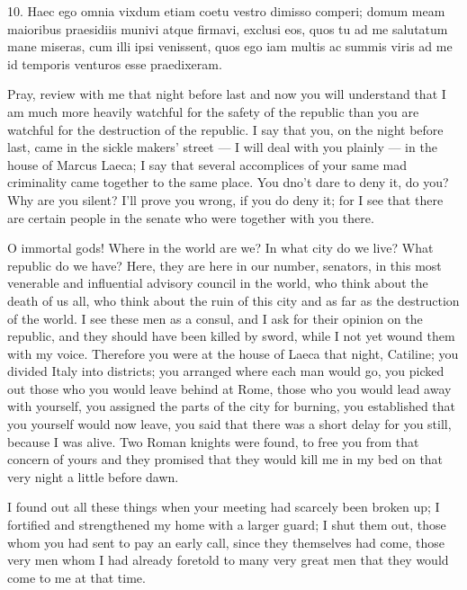 {  %
  10. Haec ego omnia vixdum etiam coetu vestro dimisso comperi; domum meam maioribus praesidiis munivi atque firmavi, exclusi eos, quos tu ad me salutatum mane miseras, cum illi ipsi venissent, quos ego iam multis ac summis viris ad me id temporis venturos esse praedixeram. 
}{
  Pray, review with me that night before last and now you will understand that I am much more heavily watchful for the safety of the republic than you are watchful for the destruction of the republic. I say that you, on the night before last, came in the sickle makers’ street --- I will deal with you plainly --- in the house of Marcus Laeca; I say that several accomplices of your same mad criminality came together to the same place. You dno’t dare to deny it, do you? Why are you silent? I’ll prove you wrong, if you do deny it; for I see that there are certain people in the senate who were together with you there.

  O immortal gods! Where in the world are we? In what city do we live? What republic do we have? Here, they are here in our number, senators, in this most venerable and influential advisory council in the world, who think about the death of us all, who think about the ruin of this city and as far as the destruction of the world. I see these men as a consul, and I ask for their opinion on the republic, and they should have been killed by sword, while I not yet wound them with my voice. Therefore you were at the house of Laeca that night, Catiline; you divided Italy into districts; you arranged where each man would go, you picked out those who you would leave behind at Rome, those who you would lead away with yourself, you assigned the parts of the city for burning, you established that you yourself would now leave, you said that there was a short delay for you still, because I was alive. Two Roman knights were found, to free you from that concern of yours and they promised that they would kill me in my bed on that very night a little before dawn. 

  I found out all these things when your meeting had scarcely been broken up; I fortified and strengthened my home with a larger guard; I shut them out, those whom you had sent to pay an early call, since they themselves had come, those very men whom I had already foretold to many very great men that they would come to me at that time.
}
